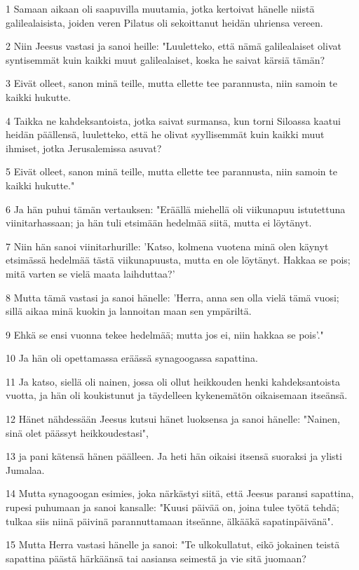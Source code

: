 \par 1 Samaan aikaan oli saapuvilla muutamia, jotka kertoivat hänelle niistä galilealaisista, joiden veren Pilatus oli sekoittanut heidän uhriensa vereen.
\par 2 Niin Jeesus vastasi ja sanoi heille: "Luuletteko, että nämä galilealaiset olivat syntisemmät kuin kaikki muut galilealaiset, koska he saivat kärsiä tämän?
\par 3 Eivät olleet, sanon minä teille, mutta ellette tee parannusta, niin samoin te kaikki hukutte.
\par 4 Taikka ne kahdeksantoista, jotka saivat surmansa, kun torni Siloassa kaatui heidän päällensä, luuletteko, että he olivat syyllisemmät kuin kaikki muut ihmiset, jotka Jerusalemissa asuvat?
\par 5 Eivät olleet, sanon minä teille, mutta ellette tee parannusta, niin samoin te kaikki hukutte."
\par 6 Ja hän puhui tämän vertauksen: "Eräällä miehellä oli viikunapuu istutettuna viinitarhassaan; ja hän tuli etsimään hedelmää siitä, mutta ei löytänyt.
\par 7 Niin hän sanoi viinitarhurille: 'Katso, kolmena vuotena minä olen käynyt etsimässä hedelmää tästä viikunapuusta, mutta en ole löytänyt. Hakkaa se pois; mitä varten se vielä maata laihduttaa?'
\par 8 Mutta tämä vastasi ja sanoi hänelle: 'Herra, anna sen olla vielä tämä vuosi; sillä aikaa minä kuokin ja lannoitan maan sen ympäriltä.
\par 9 Ehkä se ensi vuonna tekee hedelmää; mutta jos ei, niin hakkaa se pois'."
\par 10 Ja hän oli opettamassa eräässä synagoogassa sapattina.
\par 11 Ja katso, siellä oli nainen, jossa oli ollut heikkouden henki kahdeksantoista vuotta, ja hän oli koukistunut ja täydelleen kykenemätön oikaisemaan itseänsä.
\par 12 Hänet nähdessään Jeesus kutsui hänet luoksensa ja sanoi hänelle: "Nainen, sinä olet päässyt heikkoudestasi",
\par 13 ja pani kätensä hänen päälleen. Ja heti hän oikaisi itsensä suoraksi ja ylisti Jumalaa.
\par 14 Mutta synagoogan esimies, joka närkästyi siitä, että Jeesus paransi sapattina, rupesi puhumaan ja sanoi kansalle: "Kuusi päivää on, joina tulee työtä tehdä; tulkaa siis niinä päivinä parannuttamaan itseänne, älkääkä sapatinpäivänä".
\par 15 Mutta Herra vastasi hänelle ja sanoi: "Te ulkokullatut, eikö jokainen teistä sapattina päästä härkäänsä tai aasiansa seimestä ja vie sitä juomaan?
